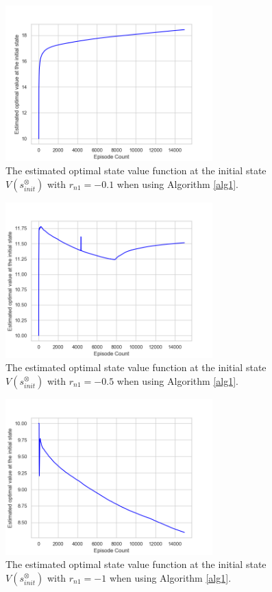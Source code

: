 \documentclass[10 pt, dvipdfmx]{article}
\theoremstyle{definition}
\begin{document}
\begin{figure}[htbp]
   \centering
   \vspace{2mm}
   \includegraphics[width = 8cm]{max_Q_value_TD.png}
   \caption{The estimated optimal state value function at the initial state $V(s^{\otimes}_{init})$ with $r_{n1} = -0.1$ when using Algorithm \ref{alg1}.}
   \label{result1}
\end{figure}

\begin{figure}[htbp]
   \centering
   \vspace{2mm}
   \includegraphics[width = 8cm]{learning_TD_v_15000_5000_rn2_05.png}
   \caption{The estimated optimal state value function at the initial state $V(s^{\otimes}_{init})$ with $r_{n1} = -0.5$ when using Algorithm \ref{alg1}.}
   \label{result2}
\end{figure}

\begin{figure}[htbp]
   \centering
   \vspace{2mm}
   \includegraphics[width = 8cm]{max_Q_value_TD_rn2_1.png}
   \caption{The estimated optimal state value function at the initial state $V(s^{\otimes}_{init})$ with $r_{n1} = -1$ when using Algorithm \ref{alg1}.}
   \label{result3}
\end{figure}
\end{document}
